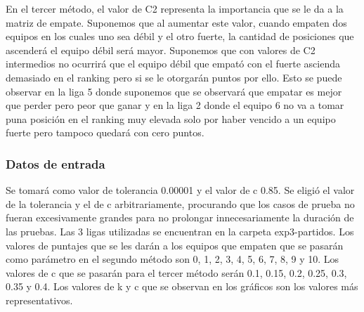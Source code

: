             En el tercer método, el valor de C2 representa la importancia que se le da a la matriz de empate. Suponemos que al aumentar este valor, cuando empaten dos equipos en los cuales uno sea débil y el otro fuerte, la cantidad de posiciones que ascenderá el equipo débil será mayor. Suponemos que con valores de C2 intermedios no ocurrirá que el equipo débil que empató con el fuerte ascienda demasiado en el ranking pero si se le otorgarán puntos por ello. Esto se puede observar en la liga 5 donde suponemos que se observará que empatar es mejor que perder pero peor que ganar y en la liga 2 donde el equipo 6 no va a tomar puna posición en el ranking muy elevada solo por haber vencido a un equipo fuerte pero tampoco quedará con cero puntos.

            \subsubsection*{Datos de entrada}
            Se tomará como valor de tolerancia 0.00001 y el valor de c 0.85. Se eligió el valor de la tolerancia y el de c arbitrariamente, procurando que los casos de prueba no fueran excesivamente grandes para no prolongar innecesariamente la duración de las pruebas. Las 3 ligas utilizadas se encuentran en la carpeta exp3-partidos. Los valores de puntajes que se les darán a los equipos que empaten que se pasarán como parámetro en el segundo método son 0, 1, 2, 3, 4, 5, 6, 7, 8, 9 y 10. Los valores de c que se pasarán para el tercer método serán 0.1, 0.15, 0.2, 0.25, 0.3, 0.35 y 0.4. Los valores de k y c que se observan en los gráficos son los valores más representativos.

